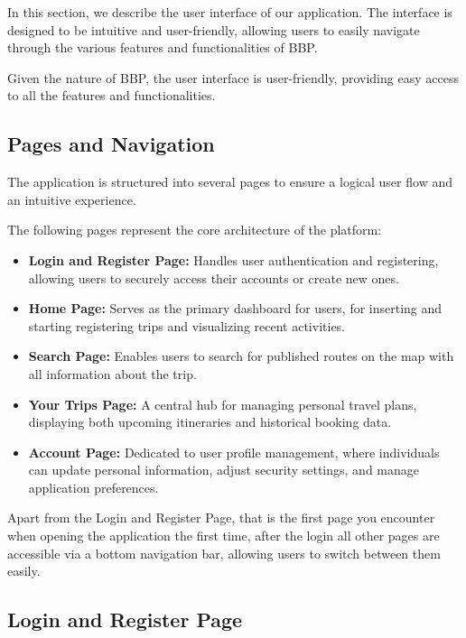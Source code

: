 In this section, we describe the user interface of our application. The interface is designed to be intuitive and user-friendly, allowing users to easily navigate through the various features and functionalities of BBP.

Given the nature of BBP, the user interface is user-friendly, providing easy access to all the features and functionalities.

\subsection*{Pages and Navigation}

The application is structured into several pages to ensure a logical user flow and an intuitive experience. 

The following pages represent the core architecture of the platform:

\begin{itemize}
    \item \textbf{Login and Register Page:} Handles user authentication and registering, allowing users to securely access their accounts or create new ones.
    \item \textbf{Home Page:} Serves as the primary dashboard for users, for inserting and starting registering trips and visualizing recent activities.
    \item \textbf{Search Page:} Enables users to search for published routes on the map with all information about the trip.
    \item \textbf{Your Trips Page:} A central hub for managing personal travel plans, displaying both upcoming itineraries and historical booking data.
    \item \textbf{Account Page:} Dedicated to user profile management, where individuals can update personal information, adjust security settings, and manage application preferences.
\end{itemize}

Apart from the Login and Register Page, that is the first page you encounter when opening the application the first time, after the login all other pages are accessible via a bottom navigation bar, allowing users to switch between them easily.

\subsection{Login and Register Page}

